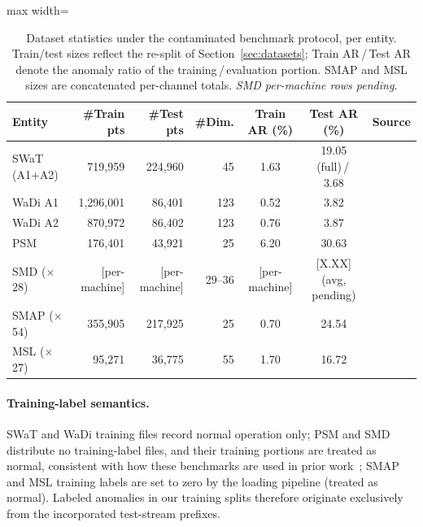 \begin{table}[tp]
\footnotesize
\centering
\caption{Dataset statistics under the contaminated benchmark protocol, per entity.
  Train/test sizes reflect the re-split of Section~\ref{sec:datasets}; Train AR\,/\,Test AR
  denote the anomaly ratio of the training\,/\,evaluation portion.
  SMAP and MSL sizes are concatenated per-channel totals.
  \textit{SMD per-machine rows pending.}}
\label{tab:per_entity}
\begin{adjustbox}{max width=\linewidth}
\begin{tabular}{lrrrccl}
\toprule
Entity & \#Train pts & \#Test pts & \#Dim. & Train AR (\%) & Test AR (\%) & Source \\
\midrule
SWaT (A1+A2) & 719{,}959 & 224{,}960 & 45 & 1.63 & 19.05 (full)\,/\,3.68 & \cite{goh2016swat} \\
WaDi A1      & 1{,}296{,}001 & 86{,}401 & 123 & 0.52 & 3.82 & \cite{ahmed2017wadi} \\
WaDi A2      & 870{,}972 & 86{,}402 & 123 & 0.76 & 3.87 & \cite{ahmed2017wadi} \\
PSM          & 176{,}401 & 43{,}921 & 25 & 6.20 & 30.63 & \cite{abdulaal2021psm} \\
SMD ($\times$28) & [per-machine] & [per-machine] & 29--36 & [per-machine] & [X.XX] (avg, pending) & \cite{su2019omnianomaly} \\
SMAP ($\times$54) & 355{,}905 & 217{,}925 & 25 & 0.70 & 24.54 & \cite{hundman2018telemanom} \\
MSL ($\times$27)  & 95{,}271 & 36{,}775 & 55 & 1.70 & 16.72 & \cite{hundman2018telemanom} \\
\bottomrule
\end{tabular}
\end{adjustbox}
\end{table}

\paragraph{Training-label semantics.}
SWaT and WaDi training files record normal operation only; PSM and SMD distribute no
training-label files, and their training portions are treated as normal, consistent with how
these benchmarks are used in prior work~\cite{su2019omnianomaly,abdulaal2021psm}; SMAP and MSL
training labels are set to zero by the loading pipeline (treated as normal).
Labeled anomalies in our training splits therefore originate exclusively from the incorporated
test-stream prefixes.

